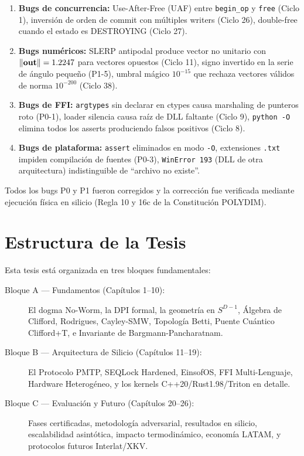 \begin{enumerate}
\item \textbf{Bugs de concurrencia:} Use-After-Free (UAF) entre \texttt{begin\_op} y \texttt{free}
(Ciclo 1), inversión de orden de commit con múltiples writers (Ciclo 26),
double-free cuando el estado es DESTROYING (Ciclo 27).

\item \textbf{Bugs numéricos:} SLERP antipodal produce vector no unitario con
$\norm{\mathbf{out}} = 1.2247$ para vectores opuestos (Ciclo 11),
signo invertido en la serie de ángulo pequeño (P1-5),
umbral mágico $10^{-15}$ que rechaza vectores válidos de norma $10^{-200}$ (Ciclo 38).

\item \textbf{Bugs de FFI:} \texttt{argtypes} sin declarar en ctypes causa
marshaling de punteros roto (P0-1), loader silencia causa raíz de DLL faltante
(Ciclo 9), \texttt{python -O} elimina todos los asserts produciendo falsos positivos (Ciclo 8).

\item \textbf{Bugs de plataforma:} \texttt{assert} eliminados en modo \texttt{-O},
extensiones \texttt{.txt} impiden compilación de fuentes (P0-3),
\texttt{WinError 193} (DLL de otra arquitectura) indistinguible de ``archivo no existe''.
\end{enumerate}

Todos los bugs P0 y P1 fueron corregidos y la corrección fue verificada mediante
ejecución física en silicio (Regla 10 y 16c de la Constitución POLYDIM).

\section{Estructura de la Tesis}

Esta tesis está organizada en tres bloques fundamentales:

\begin{description}
\item[Bloque A — Fundamentos (Capítulos 1--10):] El dogma No-Worm, la DPI formal,
la geometría en $S^{D-1}$, Álgebra de Clifford, Rodrigues, Cayley-SMW,
Topología Betti, Puente Cuántico Clifford+T, e Invariante de Bargmann-Pancharatnam.

\item[Bloque B — Arquitectura de Silicio (Capítulos 11--19):] El Protocolo PMTP,
SEQLock Hardened, EinsofOS, FFI Multi-Lenguaje, Hardware Heterogéneo,
y los kernels C++20/Rust1.98/Triton en detalle.

\item[Bloque C — Evaluación y Futuro (Capítulos 20--26):] Fases certificadas,
metodología adversarial, resultados en silicio, escalabilidad asintótica,
impacto termodinámico, economía LATAM, y protocolos futuros Interlat/XKV.
\end{description}

